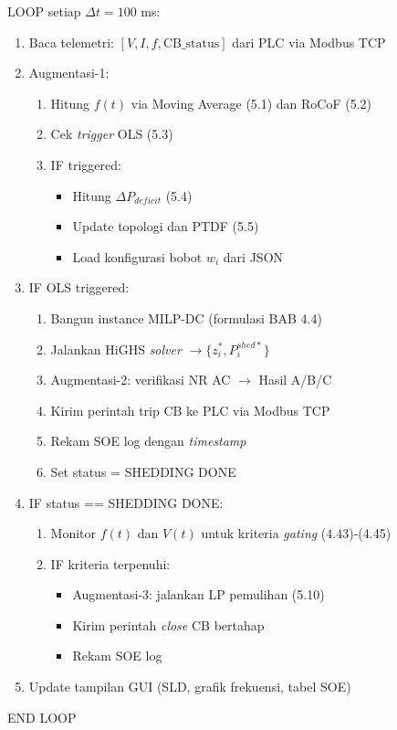 LOOP setiap $\Delta t=100$ ms:
\begin{enumerate}
    \item Baca telemetri: $[V, I, f, \text{CB\_status}]$ dari PLC via Modbus TCP
    \item Augmentasi-1:
    \begin{enumerate}
        \item[a.] Hitung $f(t)$ via Moving Average (5.1) dan RoCoF (5.2)
        \item[b.] Cek \textit{trigger} OLS (5.3)
        \item[c.] IF triggered:
        \begin{itemize}
            \item Hitung $\Delta P_{deficit}$ (5.4)
            \item Update topologi dan PTDF (5.5)
            \item Load konfigurasi bobot $w_{i}$ dari JSON
        \end{itemize}
    \end{enumerate}
    \item IF OLS triggered:
    \begin{enumerate}
        \item[a.] Bangun instance MILP-DC (formulasi BAB 4.4)
        \item[b.] Jalankan HiGHS \textit{solver} $\rightarrow \{z_{i}^{*}, P_{i}^{shed*}\}$
        \item[c.] Augmentasi-2: verifikasi NR AC $\rightarrow$ Hasil A/B/C
        \item[d.] Kirim perintah trip CB ke PLC via Modbus TCP
        \item[e.] Rekam SOE log dengan \textit{timestamp}
        \item[f.] Set status = SHEDDING DONE
    \end{enumerate}
    \item IF status == SHEDDING DONE:
    \begin{enumerate}
        \item[a.] Monitor $f(t)$ dan $V(t)$ untuk kriteria \textit{gating} (4.43)-(4.45)
        \item[b.] IF kriteria terpenuhi:
        \begin{itemize}
            \item Augmentasi-3: jalankan LP pemulihan (5.10)
            \item Kirim perintah \textit{close} CB bertahap
            \item Rekam SOE log
        \end{itemize}
    \end{enumerate}
    \item Update tampilan GUI (SLD, grafik frekuensi, tabel SOE)
\end{enumerate}
END LOOP


